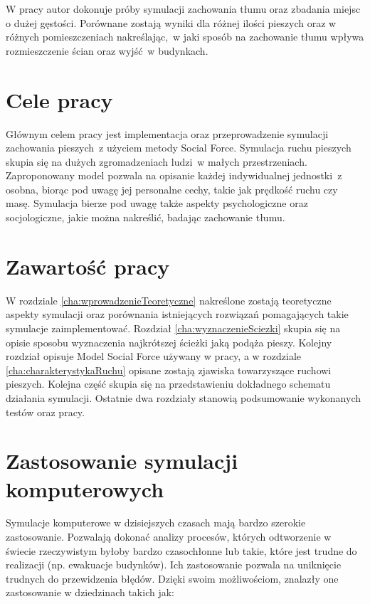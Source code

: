 W pracy autor dokonuje próby symulacji zachowania tłumu oraz zbadania miejsc o dużej gęstości. Porównane zostają wyniki dla różnej ilości pieszych oraz w różnych pomieszczeniach nakreślając,~w jaki sposób na zachowanie tłumu wpływa rozmieszczenie ścian oraz wyjść~w budynkach.



\section{Cele pracy}
\label{sec:celePracy}

Głównym celem pracy jest implementacja oraz przeprowadzenie symulacji zachowania pieszych~z użyciem metody Social Force. Symulacja ruchu pieszych skupia się na dużych zgromadzeniach ludzi~w małych przestrzeniach. Zaproponowany model pozwala na opisanie każdej indywidualnej jednostki~z osobna, biorąc pod uwagę jej personalne cechy, takie jak prędkość ruchu czy masę. Symulacja bierze pod uwagę także aspekty psychologiczne oraz socjologiczne, jakie można nakreślić, badając zachowanie tłumu.


\section{Zawartość pracy}
\label{sec:zawartoscPracy}
W rozdziale \ref{cha:wprowadzenieTeoretyczne} nakreślone zostają teoretyczne aspekty symulacji oraz porównania istniejących rozwiązań pomagających takie symulacje zaimplementować. Rozdział \ref{cha:wyznaczenieSciezki} skupia się na opisie sposobu wyznaczenia najkrótszej ścieżki jaką podąża pieszy. Kolejny rozdział opisuje Model Social Force używany w pracy, a w rozdziale \ref{cha:charakterystykaRuchu} opisane zostają zjawiska towarzyszące ruchowi pieszych. Kolejna część skupia się na przedstawieniu dokładnego schematu działania symulacji. Ostatnie dwa rozdziały stanowią podsumowanie wykonanych testów oraz pracy.


\section{Zastosowanie symulacji komputerowych}
\label{sec:ZastosowanieSymulacji}

Symulacje komputerowe w dzisiejszych czasach mają bardzo szerokie zastosowanie. Pozwalają dokonać analizy procesów, których odtworzenie w świecie rzeczywistym byłoby bardzo czasochłonne lub takie, które jest trudne do realizacji (np. ewakuacje budynków). Ich zastosowanie pozwala na uniknięcie trudnych do przewidzenia błędów. Dzięki swoim możliwościom, znalazły one zastosowanie w dziedzinach takich jak:

